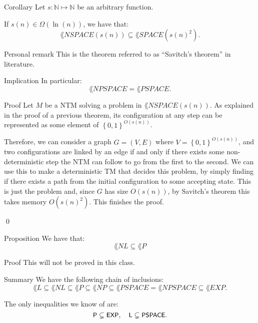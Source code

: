 \documentclass[a4paper]{article}
\begin{document}
\begin{parag}{Corollary}
    Let $s: \mathbb{N} \mapsto \mathbb{N}$ be an arbitrary function.

    If $s\left(n\right) \in \Omega\left(\ln\left(n\right)\right)$, we have that:
    \[\lang{NSPACE}\left(s\left(n\right)\right) \subseteq \lang{SPACE}\left(s\left(n\right)^2\right).\]
    
    \begin{subparag}{Personal remark}
        This is the theorem referred to as ``Savitch's theorem'' in literature. 
    \end{subparag}

    \begin{subparag}{Implication}
        In particular: 
        \[\lang{NPSPACE} = \lang{PSPACE}.\]
    \end{subparag}

    \begin{subparag}{Proof}
        Let $M$ be a NTM solving a problem in $\lang{NSPACE}\left(s\left(n\right)\right)$. As explained in the proof of a previous theorem, its configuration at any step can be represented as some element of $\left\{0, 1\right\}^{O\left(s\left(n\right)\right)}$.

        Therefore, we can consider a graph $G = \left(V, E\right)$ where $V = \left\{0, 1\right\}^{O\left(s\left(n\right)\right)}$, and two configurations are linked by an edge if and only if there exists some non-deterministic step the NTM can follow to go from the first to the second. We can use this to make a deterministic TM that decides this problem, by simply finding if there exists a path from the initial configuration to some accepting state. This is just the problem  and, since $G$ has size $O\left(s\left(n\right)\right)$, by Savitch's theorem this takes memory $O\left(s\left(n\right)^2\right)$. This finishes the proof.

        \qed
    \end{subparag}
\end{parag}

\begin{parag}{Proposition}
    We have that: 
    \[\lang{NL} \subseteq \lang{P}\]
    
    \begin{subparag}{Proof}
        This will not be proved in this class.
    \end{subparag}
\end{parag}

\begin{parag}{Summary}
    We have the following chain of inclusions: 
    \[\lang{L} \subseteq \lang{NL} \subseteq \lang{P} \subseteq \lang{NP} \subseteq \lang{PSPACE} = \lang{NPSPACE} \subseteq \lang{EXP}.\]

    The only inequalities we know of are: 
    \[\lang{P} \subsetneq \lang{EXP}, \mathspace \lang{L} \subsetneq \lang{PSPACE}.\]
\end{parag}
\end{document}
